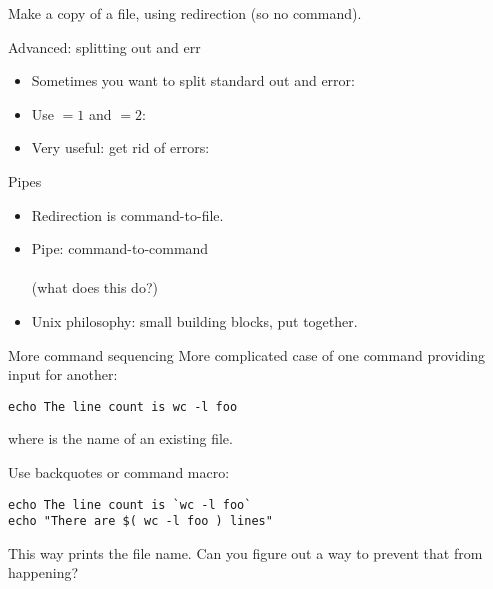 \documentclass[11pt,headernav]{beamer}
\begin{document}
\begin{exercise}{}
  Make a copy of a file, using redirection (so no  command).
\end{exercise}

\begin{numberedframe}{Advanced: splitting out and err}
  \label{sl-lnx:stderr}
  \begin{itemize}
  \item Sometimes you want to split standard out and error:
  \item Use $=1$ and $=2$:\\
  \item Very useful: get rid of errors:\\
  \end{itemize}
\end{numberedframe}

\begin{numberedframe}{Pipes}
  \label{sl-lnx:pipe}
  \begin{itemize}
  \item Redirection is command-to-file.
  \item Pipe: command-to-command\\
    \\
    (what does this do?)
  \item Unix philosophy: small building blocks, put together.
  \end{itemize}
\end{numberedframe}

\begin{numberedframe}{More command sequencing}
  \label{sl-lnx:backtick}
  More complicated case of one command providing input for another:
\begin{verbatim}
echo The line count is wc -l foo
\end{verbatim}
where  is the name of an existing file.

Use backquotes or command macro:
\begin{verbatim}
echo The line count is `wc -l foo`
echo "There are $( wc -l foo ) lines"
\end{verbatim}
\end{numberedframe}

\begin{exercise}{}
  This way  prints the file name.
  Can you figure out a way to prevent that from happening?
\end{exercise}
\end{document}
